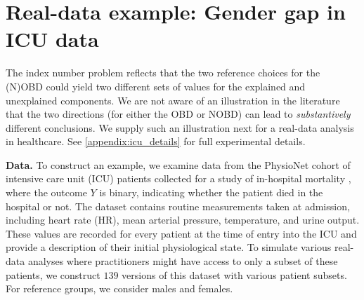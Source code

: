 \section{Real-data example: Gender gap in ICU data}
\label{sec:real_example}
The index number problem reflects that the two reference choices for the (N)OBD could yield two different sets of values for the explained and unexplained components. We are not aware of an illustration in the literature that the two directions (for either the OBD or NOBD) can lead to \emph{substantively} different conclusions. We supply such an illustration next for a real-data analysis in healthcare. See \cref{appendix:icu_details} for full experimental details.

\textbf{Data.} To construct an example, we examine data from the PhysioNet cohort of intensive care unit (ICU) patients collected for a study of in-hospital mortality \citep{goldberger2000physiobank}, where the outcome $Y$ is binary, indicating whether the patient died in the hospital or not. The dataset contains routine measurements taken at admission, including heart rate (HR), mean arterial pressure, temperature, and urine output. These values are recorded for every patient at the time of entry into the ICU and provide a description of their initial physiological state. To simulate various real-data analyses where practitioners might have access to only a subset of these patients, we construct $139$ versions of this dataset with various patient subsets.
For reference groups, we consider males and females.


